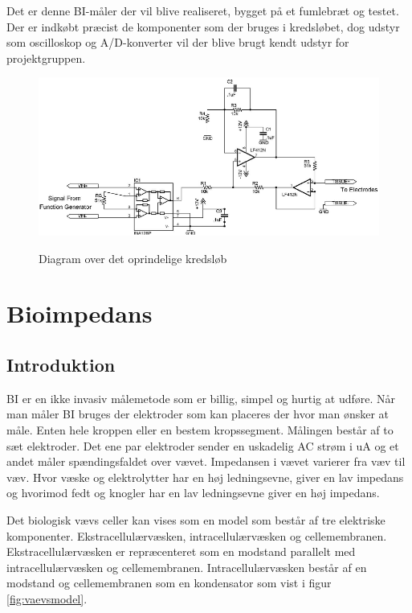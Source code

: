 Det er denne BI-måler der vil blive realiseret, bygget på et fumlebræt og testet. Der er indkøbt præcist de komponenter som der bruges i kredsløbet, dog udstyr som oscilloskop og A/D-konverter vil der blive brugt kendt udstyr for projektgruppen. 






\begin{figure}[H]
\centering
{\includegraphics[width=12cm]
{Figure/BIdiagram}}
\caption{Diagram over det oprindelige kredsløb\cite{Aroom2009}}
\label{fig:BIdiagram}
\end{figure}


\chapter{Bioimpedans}
\section{Introduktion}
BI er en ikke invasiv målemetode som er billig, simpel og hurtig at udføre. Når man måler BI bruges der elektroder som kan placeres der hvor man ønsker at måle. Enten hele kroppen eller en bestem kropssegment. Målingen består af to sæt elektroder. Det ene par elektroder sender en uskadelig AC strøm i uA og et andet måler spændingsfaldet over vævet. Impedansen i vævet varierer fra væv til væv. Hvor væske og elektrolytter har en høj ledningsevne, giver en lav impedans og hvorimod fedt og knogler har en lav ledningsevne giver en høj impedans.\cite{Brantlov2017} 

Det biologisk vævs celler kan vises som en model som består af tre elektriske komponenter. Ekstracellulærvæsken, intracellulærvæsken og cellemembranen. Ekstracellulærvæsken er repræcenteret som en modstand parallelt med intracellulærvæsken og cellemembranen. Intracellulærvæsken består af en modstand og cellemembranen som en kondensator som vist i figur \ref{fig:vaevsmodel}.

